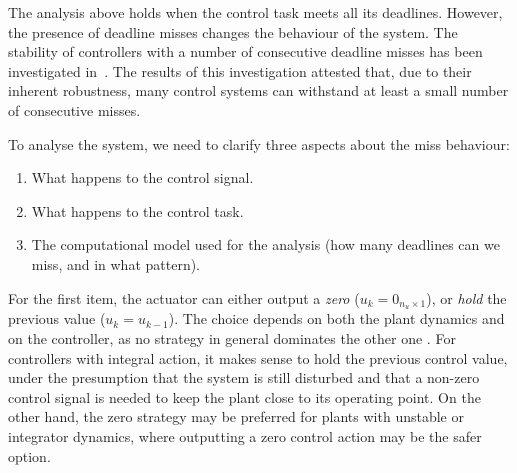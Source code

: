 The analysis above holds when the control task meets all its deadlines.
However, the presence of deadline misses changes the behaviour of the system.
The stability of controllers with a number of consecutive deadline misses has been investigated in~\cite{Maggio:2020}.
The results of this investigation attested that, due to their inherent robustness, many control systems can withstand at least a small number of consecutive misses.

To analyse the system, we need to clarify three aspects about the miss behaviour:

\begin{enumerate}[label=(\roman*)]
    \item What happens to the control signal.
    \item What happens to the control task.
    \item The computational model used for the analysis (how many deadlines can we miss, and in what pattern).
\end{enumerate}

For the first item, the actuator can either output a \emph{zero} ($u_k = 0_{n_u \times 1}$), or \emph{hold} the previous value ($u_k = u_{k-1}$).
The choice depends on both the plant dynamics and on the controller, as no strategy in general dominates the other one \cite{schenato09}.
For controllers with integral action, it makes sense to hold the previous control value, under the presumption that the system is still disturbed and that a non-zero control signal is needed to keep the plant close to its operating point.
On the other hand, the zero strategy may be preferred for plants with unstable or integrator dynamics, where outputting a zero control action may be the safer option.

